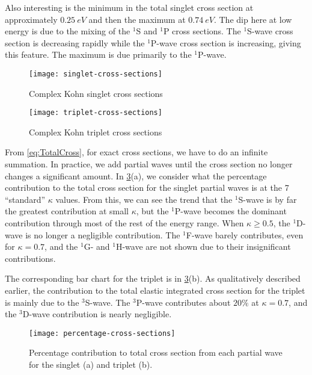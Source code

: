 \documentclass[Dissertation.tex]{subfiles}
\begin{document}
Also interesting is the minimum in the total singlet cross section at 
approximately $\SI{0.25}{eV}$ and then the maximum at $\SI{0.74}{eV}$. The dip
here at low energy is due to the mixing of the $^1$S and $^1$P cross sections.
The $^1$S-wave cross section is decreasing rapidly while the $^1$P-wave cross
section is increasing, giving this feature. The maximum is due primarily to the
$^1$P-wave.

\begin{figure}[H]
	\centering
	\texttt{[image: singlet-cross-sections]}
	\caption{Complex Kohn singlet cross sections}
	\label{fig:singlet-cross-sections}
\end{figure}

\begin{figure}[H]
	\centering
	\texttt{[image: triplet-cross-sections]}
	\caption{Complex Kohn triplet cross sections}
	\label{fig:triplet-cross-sections}
\end{figure}

From \cref{eq:TotalCross}, for exact cross sections, we have to do an infinite
summation. In practice, we add partial waves until the cross section no longer
changes a significant amount. In \cref{fig:percentage-cross-sections}(a), we
consider what the percentage contribution to the total cross section for
the singlet partial waves is at the 7 ``standard'' $\kappa$ values. From this,
we can see the trend that the $^1$S-wave is by far the greatest contribution at
small $\kappa$, but the $^1$P-wave becomes the dominant contribution through
most of the rest of the energy range. When $\kappa \geq 0.5$, the $^1$D-wave is
no longer a negligible contribution. The $^1$F-wave barely contributes, even
for $\kappa = 0.7$, and the $^1$G- and $^1$H-wave are not shown due to their
insignificant contributions.

The corresponding bar chart for the triplet is in
\cref{fig:percentage-cross-sections}(b). As qualitatively described earlier,
the contribution to the total elastic integrated cross section for
the triplet is mainly due to the $^3$S-wave. The $^3$P-wave contributes about
$20\%$ at $\kappa = 0.7$, and the $^3$D-wave contribution is nearly negligible.

\begin{figure}[H]
	\centering
	\texttt{[image: percentage-cross-sections]}
	\caption[Percentage contribution to total cross section]{Percentage contribution to total cross section from each partial wave for the singlet (a) and triplet (b).}
	\label{fig:percentage-cross-sections}
\end{figure}
\end{document}
